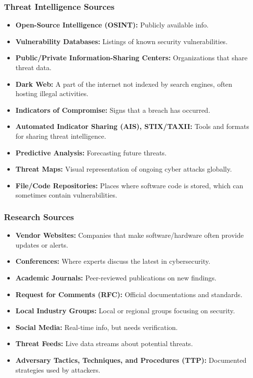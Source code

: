 \begin{fullwidth}
    \subsubsection*{\color{purple}Threat Intelligence Sources}
    \begin{itemize}
        \item \textbf{Open-Source Intelligence (OSINT):} Publicly available info.
        \item \textbf{Vulnerability Databases:} Listings of known security vulnerabilities.
        \item \textbf{Public/Private Information-Sharing Centers:} Organizations that share threat data.
        \item \textbf{Dark Web:} A part of the internet not indexed by search engines, often hosting illegal activities.
        \item \textbf{Indicators of Compromise:} Signs that a breach has occurred.
        \item \textbf{Automated Indicator Sharing (AIS), STIX/TAXII:} Tools and formats for sharing threat intelligence.
        \item \textbf{Predictive Analysis:} Forecasting future threats.
        \item \textbf{Threat Maps:} Visual representation of ongoing cyber attacks globally.
        \item \textbf{File/Code Repositories:} Places where software code is stored, which can sometimes contain vulnerabilities.
    \end{itemize}

    \subsubsection*{\color{purple}Research Sources}
    \begin{itemize}
        \item \textbf{Vendor Websites:} Companies that make software/hardware often provide updates or alerts.
        \item \textbf{Conferences:} Where experts discuss the latest in cybersecurity.
        \item \textbf{Academic Journals:} Peer-reviewed publications on new findings.
        \item \textbf{Request for Comments (RFC):} Official documentations and standards.
        \item \textbf{Local Industry Groups:} Local or regional groups focusing on security.
        \item \textbf{Social Media:} Real-time info, but needs verification.
        \item \textbf{Threat Feeds:} Live data streams about potential threats.
        \item \textbf{Adversary Tactics, Techniques, and Procedures (TTP):} Documented strategies used by attackers.
    \end{itemize}    
\end{fullwidth}
\newpage


